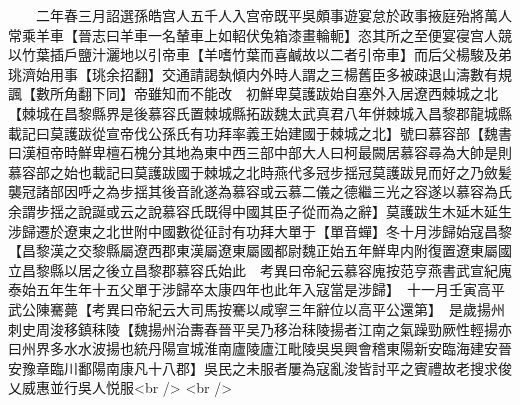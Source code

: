 　　二年春三月詔選孫皓宫人五千人入宫帝既平吳頗事遊宴怠於政事掖庭殆將萬人常乘羊車【晉志曰羊車一名輦車上如軺伏兔箱漆畫輪軛】恣其所之至便宴寑宫人競以竹葉插戶鹽汁灑地以引帝車【羊嗜竹葉而喜鹹故以二者引帝車】而后父楊駿及弟珧濟始用事【珧余招翻】交通請謁埶傾内外時人謂之三楊舊臣多被疎退山濤數有規諷【數所角翻下同】帝雖知而不能改　初鮮卑莫護跋始自塞外入居遼西棘城之北【棘城在昌黎縣界是後慕容氏置棘城縣拓跋魏太武真君八年併棘城入昌黎郡龍城縣載記曰莫護跋從宣帝伐公孫氏有功拜率義王始建國于棘城之北】號曰慕容部【魏書曰漢桓帝時鮮卑檀石槐分其地為東中西三部中部大人曰柯最闕居慕容尋為大帥是則慕容部之始也載記曰莫護跋國于棘城之北時燕代多冠步揺冠莫護跋見而好之乃斂髪襲冠諸部因呼之為步揺其後音訛遂為慕容或云慕二儀之德繼三光之容遂以慕容為氏余謂步揺之說誕或云之說慕容氏既得中國其臣子從而為之辭】莫護跋生木延木延生涉歸遷於遼東之北世附中國數從征討有功拜大單于【單音蟬】冬十月涉歸始寇昌黎【昌黎漢之交黎縣屬遼西郡東漢屬遼東屬國都尉魏正始五年鮮卑内附復置遼東屬國立昌黎縣以居之後立昌黎郡慕容氏始此　考異曰帝紀云慕容廆按范亨燕書武宣紀廆泰始五年生年十五父單于涉歸卒太康四年也此年入寇當是涉歸】　十一月壬寅高平武公陳騫薨【考異曰帝紀云大司馬按騫以咸寧三年辭位以高平公還第】　是歲揚州刺史周浚移鎮秣陵【魏揚州治夀春晉平吴乃移治秣陵揚者江南之氣躁勁厥性輕揚亦曰州界多水水波揚也統丹陽宣城淮南廬陵廬江毗陵吳吳興會稽東陽新安臨海建安晉安豫章臨川鄱陽南康凡十八郡】吳民之未服者屢為寇亂浚皆討平之賓禮故老搜求俊乂威惠並行吳人悦服<br />
<br />
